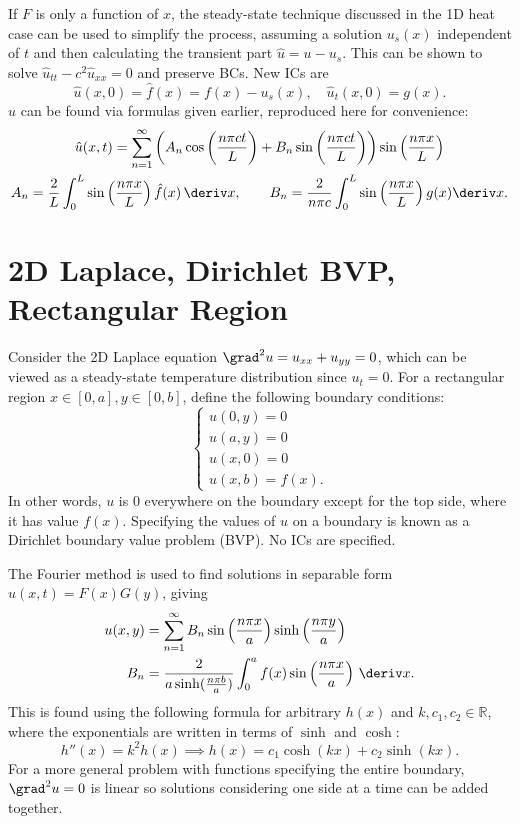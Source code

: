 \documentclass[10pt, a4paper]{article}
\begin{document}
\begin{landscape}
\begin{multicols*}{2}
    If \(F\) is only a function of \(x\), the steady-state technique discussed in the 1D heat case can be used
    to simplify the process, assuming a solution \(u_s(x)\) independent of \(t\) and then calculating the transient
    part \(\hat u = u - u_s\). This can be shown to solve \(\hat u_{tt} - c^2 \hat u_{xx} = 0\) and preserve BCs.
    New ICs are
    \[
        \hat u(x, 0) = \hat f(x) = f(x) - u_s(x),
        \quad
        \hat u_t(x, 0) = g(x).
    \]
    \(\hat u\) can be found via formulas given earlier, reproduced here for convenience:
    \begin{gather*}
        \hat u(x, t) = \sum_{n=1}^{\infty} \left(
            A_n \cos\left(\frac{n \pi c t}{L}\right) + B_n \sin\left(\frac{n \pi ct}{L}\right)
            \right) \sin \left(\frac{n \pi x}{L}\right) \\
        A_n = \frac{2}{L} \int_0^L \sin\left(\frac{n \pi x}{L}\right) \hat f(x) \,\deriv x,
        \qquad
        B_n = \frac{2}{n \pi c} \int_0^L \sin\left(\frac{n \pi x}{L}\right) g(x) \deriv x.
    \end{gather*}

    \section{2D Laplace, Dirichlet BVP, Rectangular Region}

    Consider the 2D Laplace equation \(\grad^2 u = u_{xx} + u_{yy} = 0\), which can be viewed as a steady-state
    temperature distribution since \(u_{t} = 0\). For a rectangular region \(x \in [0, a], y \in [0, b]\),
    define the following boundary conditions:
    \[
        \begin{cases}
            u(0, y) = 0 \\
            u(a, y) = 0 \\
            u(x, 0) = 0 \\
            u(x, b) = f(x).
        \end{cases}
    \]
    In other words, \(u\) is 0 everywhere on the boundary except for the top side, where it has value \(f(x)\).
    Specifying the values of \(u\) on a boundary is known as a Dirichlet boundary value problem (BVP).
    No ICs are specified.
    
    The Fourier method is used to find solutions in separable form \(u(x, t) = F(x) G(y)\), giving
    \begin{align*}
        u(x, y) &= \sum_{n=1}^{\infty} B_{n} \sin \left(\frac{n \pi x}{a}\right) \sinh \left(\frac{n \pi y}{a}\right) \\
        B_n &= \frac{2}{a \sinh(\frac{n \pi b}{a})} \int_{0}^{a} f(x) \sin \left(\frac{n \pi x}{a}\right) \,\deriv x.
    \end{align*}
    This is found using the following formula for arbitrary \(h(x)\) and \(k, c_1, c_2 \in \mathbb{R}\),
    where the exponentials are written in terms of \(\sinh\) and \(\cosh\):
    \[
        h''(x) = k^2 h(x) \implies h(x) = c_1 \cosh(kx) + c_2 \sinh(kx).
    \]
    For a more general problem with functions specifying the entire boundary, \(\grad^2 u = 0\) is linear
    so solutions considering one side at a time can be added together.
    

\end{multicols*}
\end{landscape}
\end{document}
